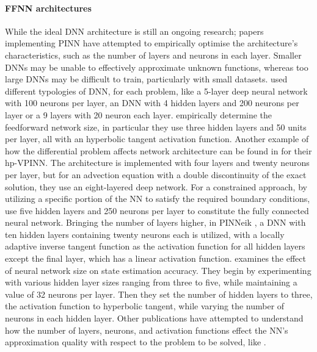 \documentclass[pdflatex,sn-basic]{sn-jnl}%
\theoremstyle{thmstyleone}%
\theoremstyle{thmstyletwo}%
\theoremstyle{thmstylethree}%
\begin{document}
\paragraph{FFNN architectures}
While the ideal DNN architecture is still an ongoing research; papers implementing PINN have attempted to empirically optimise the architecture's characteristics, such as the number of layers and neurons in each layer.
%
Smaller DNNs may be unable to effectively approximate unknown functions, whereas too large DNNs may be difficult to train, particularly with small datasets. 
%
\cite{Rai2019_PhysicsInformedNeural_PerRPK} used different typologies of DNN, for each problem, like a 5-layer deep neural network with 100 neurons per layer, an DNN with 4 hidden layers and 200 neurons per layer or a  9 layers with 20 neuron each layer.
\cite{Tar2020_PhysicsInformedDeep_MarTMP} 
empirically determine the feedforward network size, in particular they use three hidden layers and 50 units per layer, all with an hyperbolic tangent activation function.
%
Another example of how the differential problem  affects network architecture can be found in \cite{Kha2021_HpVpinnsVariational_ZhaKZK} for their hp-VPINN. The architecture is implemented with four layers and twenty neurons per layer, but for an advection equation with a double discontinuity of the exact solution, they use an eight-layered deep network. 
For a constrained approach,  by utilizing a specific portion of the NN to satisfy the required boundary conditions, \cite{Zhu2021_MachineLearningMetal_LiuZLY} use five hidden layers and 250 neurons per layer to constitute the fully connected neural network.
Bringing the number of layers higher, 
in PINNeik \citep{Wah2021_PinneikEikonalSolution_HagWHA}, a DNN with ten hidden layers containing twenty neurons each is utilized, with a locally adaptive inverse tangent function as the activation function for all hidden layers except the final layer, which has a linear activation function. 
%
\cite{He2020_PhysicsInformedNeural_BarHBTT} examines the effect of neural network size on state estimation accuracy.
They begin by experimenting with various hidden layer sizes ranging from three to five, while maintaining a value of 32 neurons per layer.
Then they set the number of hidden layers to three, the activation function to  hyperbolic tangent, while varying the number of neurons in each hidden layer. 
Other publications have attempted to understand how the number of layers, neurons, and activation functions effect the NN's approximation quality with respect to the problem to be solved, like \citep{Ble2021_ThreeWaysSolve_ErnBE}.  %
\end{document}

